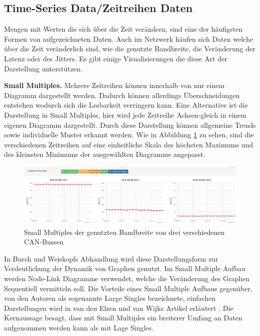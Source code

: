 \documentclass[draft=false
              ,paper=a4
              ,twoside=false
              ,fontsize=11pt
              ,headsepline
              ,BCOR10mm
              ,DIV11
              ]{scrbook}
\begin{document}
\subsection{Time-Series Data/Zeitreihen Daten} %
\label{ssub:time_series_data_zeitreihen_daten}
Mengen mit Werten die sich über die Zeit verändern, sind eine der häufigsten Formen von aufgezeichneten Daten. Auch im Netzwerk häufen sich Daten welche über die Zeit veränderlich sind, wie die genutzte Bandbreite, die Veränderung der Latenz oder des Jitters. Es gibt einige Visualisierungen die diese Art der Darstellung unterstützen. 

\textbf{Small Multiples.} Mehrere Zeitreihen können innerhalb von nur einem Diagramm dargestellt werden. Dadurch können allerdings Überschneidungen entstehen wodurch sich die Lesbarkeit verringern kann. Eine Alternative ist die Darstellung in Small Multiples, hier wird jede Zeitreihe Achsen-gleich in einem eigenen Diagramm dargestellt. Durch diese Darstellung können allgemeine Trends sowie individuelle Muster erkannt werden. Wie in Abbildung \ref{fig:synch_splines} zu sehen, sind die verschiedenen Zeitreihen auf eine einheitliche Skala des höchsten Maximums und des kleinsten Minimums der ausgewählten Diagramme angepasst.
\begin{figure}[htbp]
  \centering
  \includegraphics[width=\textwidth]{img/synch_splines}
  \caption{Small Multiples der genutzten Bandbreite von drei verschiedenen CAN-Bussen}
  \label{fig:synch_splines}
\end{figure}

In Burch und Weiskopfs Abhandlung \cite{Burch:2014:FES:2636240.2636839} wird diese Darstellungsform zur Verdeutlichung der Dynamik von Graphen genutzt. Im Small Multiple Aufbau werden Node-Link Diagramme verwendet, welche die Veränderung des Graphen Sequentiell vermitteln soll. Die Vorteile eines Small Multiple Aufbaus gegenüber, von den Autoren als sogenannte Large Singles bezeichnete, einfachen Darstellungen wird in van den Elzen und van Wijks Artikel erläutert \cite{elzen_small_multiple_2013}. Die Kernaussage besagt, dass mit Small Multiples ein breiterer Umfang an Daten aufgenommen werden kann als mit Lage Singles.
\end{document}
